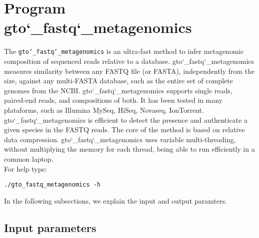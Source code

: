 \section{Program gto\char`_fastq\char`_metagenomics}
The \texttt{gto\char`_fastq\char`_metagenomics} is an ultra-fast method to infer metagenomic composition of sequenced reads relative to a database. gto\char`_fastq\char`_metagenomics measures similarity between any FASTQ file (or FASTA), independently from the size, against any multi-FASTA database, such as the entire set of complete genomes from the NCBI. gto\char`_fastq\char`_metagenomics supports single reads, paired-end reads, and compositions of both. It has been tested in many plataforms, such as Illumina MySeq, HiSeq, Novaseq, IonTorrent.\\
gto\char`_fastq\char`_metagenomics is efficient to detect the presence and authenticate a given species in the FASTQ reads. The core of the method is based on relative data compression. gto\char`_fastq\char`_metagenomics uses variable multi-threading, without multiplying the memory for each thread, being able to run efficiently in a common laptop.\\
For help type:
\begin{lstlisting}
./gto_fastq_metagenomics -h
\end{lstlisting}
In the following subsections, we explain the input and output paramters.

\subsection*{Input parameters}

